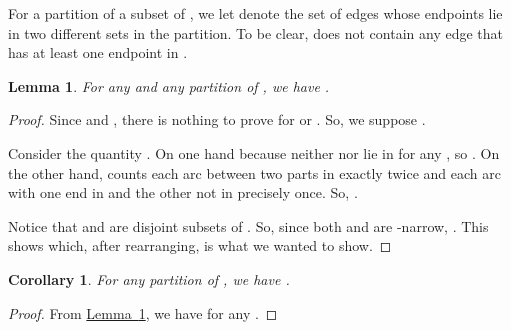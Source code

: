 \documentclass[11pt]{article}
\newcommand{\lref}[2][]{\hyperref[#2]{#1~\ref*{#2}}}
\newtheorem{lemma}[theorem]{Lemma}
\newtheorem{corollary}[theorem]{Corollary}
\theoremstyle{definition}
\newcounter{note}[section]
\begin{document}
For a partition  of a subset of , we let
 denote the set of edges whose endpoints lie in two different
sets in the partition. To be clear,  does not contain any edge that has at least one endpoint in .

\begin{lemma}\label{lem:parts}
For any  and any partition  of , we have .
\end{lemma}
\begin{proof}
Since  and , there is nothing to prove for  or . So, we suppose .

Consider the quantity .
On one hand  because neither  nor  lie in  for any , so
. On the other hand,  counts each arc between two parts in  exactly twice and each
arc with one end in  and the other not in  precisely once. So, .

Notice that  and  are disjoint subsets of .
So, since both  and  are -narrow, .
This shows  which, after rearranging, is what we wanted to show.
\end{proof}





\begin{corollary}\label{cor:parts}
  For any partition  of , we have
  .
\end{corollary}
\begin{proof}
From \lref[Lemma]{lem:parts}, we have  for any .
\end{proof}
\end{document}
